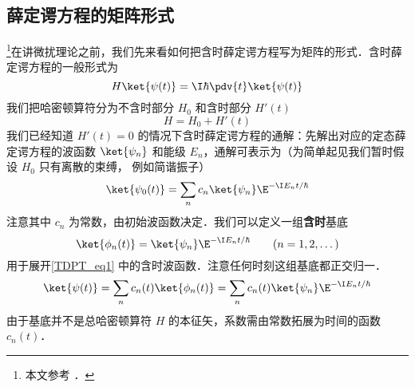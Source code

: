 

\subsection{薛定谔方程的矩阵形式}
\footnote{本文参考 \cite{GriffQ}．}在讲微扰理论之前，我们先来看如何把含时薛定谔方程写为矩阵的形式．含时薛定谔方程的一般形式为
\begin{equation}\label{TDPT_eq1}
H \ket{\psi(t)} = \I\hbar \pdv{t} \ket{\psi(t)}
\end{equation}
我们把哈密顿算符分为不含时部分 $H_0$ 和含时部分 $H'(t)$
\begin{equation}
H = H_0 + H'(t)
\end{equation}
我们已经知道 %
$H'(t) = 0$ 的情况下含时薛定谔方程的通解：先解出对应的定态薛定谔方程的波函数 $\ket{\psi_n}$ 和能级 $E_n$，通解可表示为（为简单起见我们暂时假设 $H_0$ 只有离散的束缚， 例如简谐振子）
\begin{equation}
\ket{\psi_0(t)} = \sum_n c_n \ket{\psi_n} \E^{-\I E_n t/\hbar}
\end{equation}
注意其中 $c_n$ 为常数，由初始波函数决定．我们可以定义一组\textbf{含时}基底
\begin{equation}
\ket{\phi_n(t)} = \ket{\psi_n} \E^{-\I E_n t/\hbar} \qquad (n = 1, 2, \dots)
\end{equation}
用于展开\autoref{TDPT_eq1} 中的含时波函数．注意任何时刻这组基底都正交归一．
\begin{equation}
\ket{\psi(t)} = \sum_n c_n(t) \ket{\phi_n(t)} = \sum_n c_n(t) \ket{\psi_n} \E^{-\I E_n t/\hbar}
\end{equation}
由于基底并不是总哈密顿算符 $H$ 的本征矢，系数需由常数拓展为时间的函数 $c_n(t)$．

